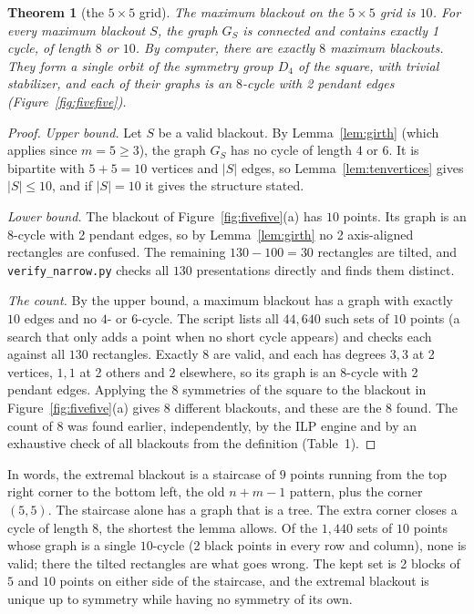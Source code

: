 \documentclass[12pt]{article}
\newtheorem{theorem}{Theorem}
\theoremstyle{definition}\newtheorem{definition}{Definition}
\theoremstyle{remark}\newtheorem{remark}{Remark}
\begin{document}
\begin{theorem}[the $5\times5$ grid]\label{thm:fivefive}
The maximum blackout on the $5\times5$ grid is $10$. For every maximum
blackout $S$, the graph $G_S$ is connected and contains exactly 1 cycle, of
length $8$ or $10$. By computer, there are exactly $8$ maximum blackouts. They
form a single orbit of the symmetry group $D_4$ of the square, with trivial
stabilizer, and each of their graphs is an $8$-cycle with 2 pendant edges
(Figure~\ref{fig:fivefive}).
\end{theorem}
\begin{proof}
\emph{Upper bound.} Let $S$ be a valid blackout. By Lemma~\ref{lem:girth}
(which applies since $m=5\ge3$), the graph $G_S$ has no cycle of length $4$ or $6$. It
is bipartite with $5+5=10$ vertices and $|S|$ edges, so
Lemma~\ref{lem:tenvertices} gives $|S|\le10$, and if $|S|=10$ it gives the
structure stated.

\emph{Lower bound.} The blackout of Figure~\ref{fig:fivefive}(a) has $10$
points. Its graph is an $8$-cycle with 2 pendant edges, so by
Lemma~\ref{lem:girth} no 2 axis-aligned rectangles are confused. The remaining
$130-100=30$ rectangles are tilted, and \texttt{verify\_narrow.py} checks all
$130$ presentations directly and finds them distinct.

\emph{The count.} By the upper bound, a maximum blackout has a graph with
exactly $10$ edges and no $4$- or $6$-cycle. The script lists all $44{,}640$
such sets of $10$ points (a search that only adds a point when no short cycle
appears) and checks each against all $130$ rectangles. Exactly $8$ are valid, and each
has degrees $3,3$ at 2 vertices, $1,1$ at 2 others and $2$ elsewhere, so its graph is an
$8$-cycle with 2 pendant edges.
Applying the $8$ symmetries of the square to the blackout in
Figure~\ref{fig:fivefive}(a) gives $8$ different blackouts, and these are the $8$
found. The count of $8$ was found earlier, independently, by the ILP engine and
by an exhaustive check of all blackouts from the definition (Table~1).
\end{proof}

In words, the extremal blackout is a staircase of $9$ points running from the
top right corner to the bottom left, the old $n+m-1$ pattern, plus the
corner $(5,5)$. The staircase alone has a graph that is a tree. The
extra corner closes a cycle of length $8$, the shortest the lemma allows. Of the $1{,}440$ sets of $10$ points
whose graph is a single $10$-cycle (2 black points in every row and column),
none is valid; there the tilted rectangles are what goes wrong. The kept set is
2 blocks of $5$ and $10$ points on either side of the staircase, and the
extremal blackout is unique up to symmetry while having no symmetry of its own.
\end{document}
